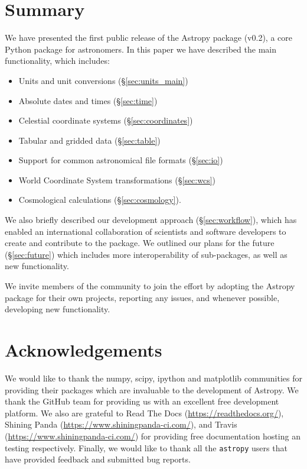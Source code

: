 \documentclass[traditabstract]{aa}
\newcommand{\astropy}{\texttt{astropy}\xspace}
\begin{document}
\section{Summary}

\label{sec:summary}


We have presented the first public release of the Astropy package (v0.2), a
core Python package for astronomers. In this paper we have described the main
functionality, which includes:

\begin{itemize}
\item Units and unit conversions (\S\ref{sec:units_main})
\item Absolute dates and times (\S\ref{sec:time})
\item Celestial coordinate systems (\S\ref{sec:coordinates})
\item Tabular and gridded data (\S\ref{sec:table})
\item Support for common astronomical file formats (\S\ref{sec:io})
\item World Coordinate System transformations (\S\ref{sec:wcs})
\item Cosmological calculations (\S\ref{sec:cosmology}).
\end{itemize}

We also briefly described our development approach (\S\ref{sec:workflow}),
which has enabled an international collaboration of scientists and software
developers to create and contribute to the package. We outlined our plans for
the future (\S\ref{sec:future}) which includes more interoperability of
sub-packages, as well as new functionality.

We invite members of the community to join the effort by adopting the Astropy package for
their own projects, reporting any issues, and whenever possible, developing new
functionality.


\section{Acknowledgements}

\label{sec:acknowledgements}

We would like to thank the \gls{numpy}, \gls{scipy}, \gls{ipython} and
\gls{matplotlib} communities for providing their packages which are invaluable
to the development of Astropy. We thank the GitHub team for providing us with
an excellent free development platform. We also are grateful to Read The Docs
(\url{https://readthedocs.org/}), Shining Panda
(\url{https://www.shiningpanda-ci.com/}), and Travis
(\url{https://www.shiningpanda-ci.com/}) for providing free documentation
hosting an testing respectively. Finally, we would like to thank all the
\astropy users that have provided feedback and submitted bug reports.



\end{document}
